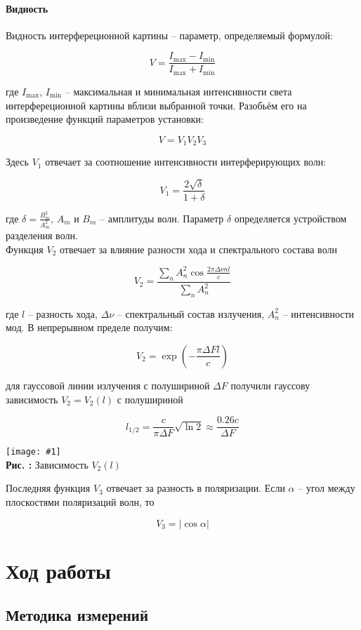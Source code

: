 \documentclass[12pt,a4paper]{article}
\newcounter{picture}
\newcommand{\embed}[3]{\begin{center}
		\texttt{[image: \#1]}
		\\\textbf{Рис. \thepicture:} #3
		\label{pic_\thepicture}
		\addtocounter{picture}{1}
\end{center}}
\begin{document}
	\paragraph*{Видность} \hfill
	
	Видность интерфереционной картины -- параметр, определяемый формулой:
	
	$$ V = \dfrac{I_{\max} - I_{\min}}{I_{\max} + I_{\min}} $$
	
	где $I_{\max}$, $I_{\min}$ -- максимальная и минимальная интенсивности света интерфереционной картины вблизи выбранной точки. Разобьём его на произведение функций параметров установки:
	
	$$ V = V_1 V_2 V_3 $$
	
	Здесь $V_1$ отвечает за соотношение интенсивности интерферирующих волн:
	
	$$ V_1 = \dfrac{2\sqrt{\delta}}{1+\delta} $$
	
	где $\delta = \frac{B_m^2}{A_m^2}$, $A_m$ и $B_m$ -- амплитуды волн. Параметр $\delta$ определяется устройством разделения волн.\\
	Функция $V_2$ отвечает за влияние разности хода и спектрального состава волн

	$$ V_2 = \dfrac{\sum\limits_n A^2_n \cos \frac{2\pi \Delta \nu n l}{c}}{\sum\limits_n A_n^2} $$
	
	где $l$ -- разность хода, $\Delta \nu$ -- спектральный состав излучения, $A_n^2$ -- интенсивности мод. В непрерывном пределе получим:
	
	$$ V_2 = \exp\left(-\frac{\pi \Delta F l}{c}\right) $$
	
	для гауссовой линии излучения с полушириной $\Delta F$ получили гауссову зависимость $V_2 = V_2(l)$ с полушириной 
	
	$$ l_{1/2} = \dfrac{c}{\pi \Delta F}\sqrt{\ln 2} \approx \dfrac{0.26 c}{\Delta F} $$
	
	\embed{PIC_2.png}{0.25}{Зависимость $V_2(l)$}
	
	Последняя функция $V_3$ отвечает за разность в поляризации. Если $\alpha$ -- угол между плоскостями поляризаций волн, то
	
	$$ V_3 = |\cos \alpha| $$
	
	\section{Ход работы}
	
	\subsection{Методика измерений}
	
\end{document}
